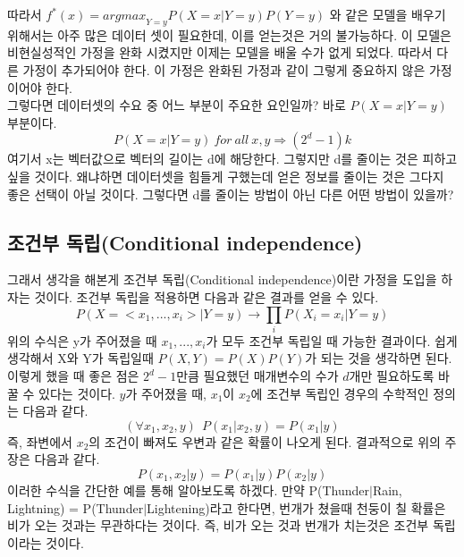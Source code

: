 \documentclass[a4paper]{oblivoir}
\begin{document}
\indent 따라서 $f^*(x)={argmax}_{Y=y} P(X=x|Y=y)P(Y=y)$ 와 같은 모델을 배우기 위해서는 아주 많은 데이터 셋이 필요한데, 이를 얻는것은 거의 불가능하다. 이 모델은 비현실성적인 가정을 완화 시켰지만 이제는 모델을 배울 수가 없게 되었다. 따라서 다른 가정이 추가되어야 한다. 이 가정은 완화된 가정과 같이 그렇게 중요하지 않은 가정이어야 한다.\\
\indent 그렇다면 데이터셋의 수요 중 어느 부분이 주요한 요인일까? 바로 $P(X=x|Y=y)$ 부분이다. 
$$P(X=x|Y=y)\ for\ all\ x,y \Rightarrow (2^d-1)k $$
여기서 x는 벡터값으로 벡터의 길이는 d에 해당한다. 그렇지만 d를 줄이는 것은 피하고 싶을 것이다. 왜냐하면 데이터셋을 힘들게 구했는데 얻은 정보를 줄이는 것은 그다지 좋은 선택이 아닐 것이다. 그렇다면 d를 줄이는 방법이 아닌 다른 어떤 방법이 있을까?\\

\subsection{조건부 독립(Conditional independence)}
그래서 생각을 해본게 조건부 독립(Conditional independence)이란 가정을 도입을 하자는 것이다. 조건부 독립을 적용하면 다음과 같은 결과를 얻을 수 있다.
\begin{equation}
P(X =< x_1,...,x_i>|Y=y)\rightarrow\prod_i P(X_i = x_i|Y =y)
\end{equation}
\indent 위의 수식은 y가 주어졌을 때 $x_1,...,x_i$가 모두 조건부 독립일 때 가능한 결과이다. 쉽게 생각해서 X와 Y가 독립일때 $P(X,Y)=P(X)P(Y)$가 되는 것을 생각하면 된다. 이렇게 했을 때 좋은 점은 $2^d-1$만큼 필요했던 매개변수의 수가 $d$개만 필요하도록 바꿀 수 있다는 것이다. $y$가 주어졌을 때, $x_1$이 $x_2$에 조건부 독립인 경우의 수학적인 정의는 다음과 같다.
\begin{equation}
(\forall x_1,x_2,y)\ \ P(x_1|x_2,y) = P(x_1|y)
\end{equation}
즉, 좌변에서 $x_2$의 조건이 빠져도 우변과 같은 확률이 나오게 된다. 결과적으로 위의 주장은 다음과 같다.
\begin{equation}
P(x_1,x_2|y) = P(x_1|y)P(x_2|y)
\end{equation}
이러한 수식을 간단한 예를 통해 알아보도록 하겠다. 만약 P(Thunder$|$Rain, Lightning) = P(Thunder$|$Lightening)라고 한다면, 번개가 쳤을때 천둥이 칠 확률은 비가 오는 것과는 무관하다는 것이다. 즉, 비가 오는 것과 번개가 치는것은 조건부 독립이라는 것이다.\\\\
\end{document}
